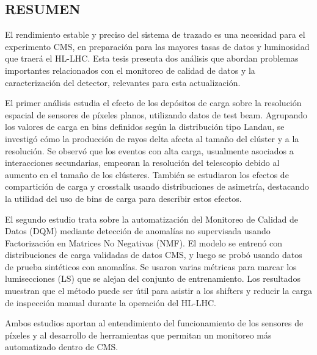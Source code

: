 \newpage





\vspace*{0.5in}
\begin{center}
\section*{RESUMEN}
\end{center}

El rendimiento estable y preciso del sistema de trazado es una necesidad para el experimento CMS, en preparación para las mayores tasas de datos y luminosidad que traerá el HL-LHC. Esta tesis presenta dos análisis que abordan problemas importantes relacionados con el monitoreo de calidad de datos y la caracterización del detector, relevantes para esta actualización.

El primer análisis estudia el efecto de los depósitos de carga sobre la resolución espacial de sensores de píxeles planos, utilizando datos de test beam. Agrupando los valores de carga en bins definidos según la distribución tipo Landau, se investigó cómo la producción de rayos delta afecta al tamaño del clúster y a la resolución. Se observó que los eventos con alta carga, usualmente asociados a interacciones secundarias, empeoran la resolución del telescopio debido al aumento en el tamaño de los clústeres. También se estudiaron los efectos de compartición de carga y crosstalk usando distribuciones de asimetría, destacando la utilidad del uso de bins de carga para describir estos efectos.

El segundo estudio trata sobre la automatización del Monitoreo de Calidad de Datos (DQM) mediante detección de anomalías no supervisada usando Factorización en Matrices No Negativas (NMF). El modelo se entrenó con distribuciones de carga validadas de datos CMS, y luego se probó usando datos de prueba sintéticos con anomalías. Se usaron varias métricas para marcar los lumisecciones (LS) que se alejan del conjunto de entrenamiento. Los resultados muestran que el método puede ser útil para asistir a los shifters y reducir la carga de inspección manual durante la operación del HL-LHC.

Ambos estudios aportan al entendimiento del funcionamiento de los sensores de píxeles y al desarrollo de herramientas que permitan un monitoreo más automatizado dentro de CMS.



